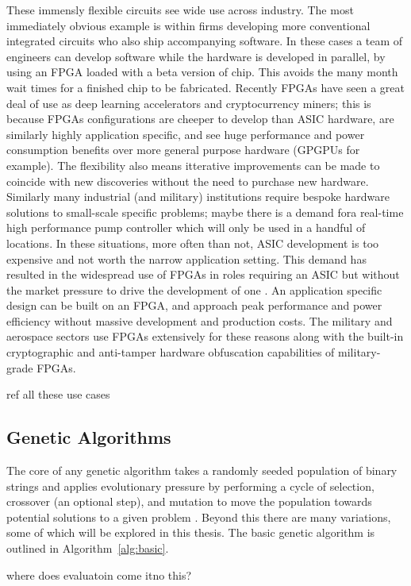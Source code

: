 These immensly flexible circuits see wide use across industry. The most immediately
obvious example is
within firms developing more conventional integrated circuits who also ship accompanying
software. In these cases a team of engineers can develop software
while the hardware is developed in parallel, by using an FPGA loaded with a beta version
of chip. This avoids the many month wait times for a finished chip to be fabricated.
Recently FPGAs have seen a great deal of use as deep learning accelerators and cryptocurrency
miners; this is because FPGAs
configurations are cheeper to develop than ASIC hardware, are similarly highly application specific,
and see huge performance and power consumption benefits over more general purpose
hardware (GPGPUs for example). The flexibility also means itterative improvements
can be made to coincide with new discoveries without the need to purchase new
hardware. Similarly many industrial (and military) institutions require
bespoke hardware solutions to small-scale specific problems; maybe there is a
demand fora real-time high performance
pump controller which will only be used in a handful of locations. In these situations,
more often than not, ASIC
development is too expensive and not worth the narrow application setting. This demand has resulted in
the widespread use of FPGAs
in roles requiring an ASIC but without the market pressure to drive the development
of one \cite{4267891}.
An application specific design can be built on an FPGA, and approach peak performance and power
efficiency without massive development and production costs.
The military and aerospace sectors use FPGAs extensively for these reasons along with
the built-in cryptographic and anti-tamper hardware obfuscation capabilities of
military-grade FPGAs.

\todo ref all these use cases

\subsection{Genetic Algorithms}
The core of any genetic algorithm takes a randomly seeded population of binary strings
and applies
evolutionary pressure by performing a cycle of selection, crossover (an optional
step), and mutation
to move the population towards potential solutions to a given problem \cite{Goldberg:1989:GAS:534133}.
Beyond this there are many
variations, some of which will be explored in this thesis. The basic genetic algorithm is
outlined in Algorithm~\ref{alg:basic}.

\todo where does evaluatoin come itno this?

